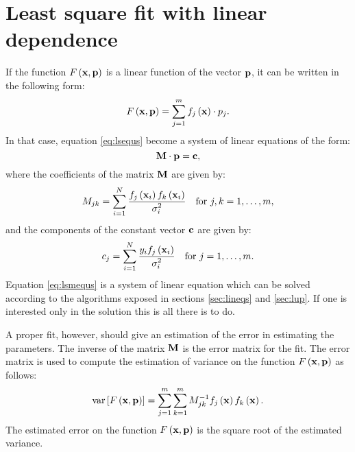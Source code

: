 \documentclass[twoside]{book}
\begin{document}
\section{Least square fit with linear dependence}
\label{eq:lslinear} If the function $F\left({\bf x},{\bf
p}\right)$ is a linear function of the vector ${\bf p}$, it can be
written in the following form:
\begin{equation}
  F\left({\bf x},{\bf p}\right)=\sum_{j=1}^m f_j\left({\bf
  x}\right)\cdot p_j.
\end{equation}
In that case, equation \ref{eq:lsequs} become a system of linear
equations of the form:
\begin{equation}
\label{eq:lsmequs}
  {\bf M}\cdot{\bf p}={\bf c},
\end{equation}
where the coefficients of the matrix ${\bf M}$ are given by:
\begin{equation}
  M_{jk}=\sum_{i=1}^N {\displaystyle f_j\left({\bf x}_i\right)f_k\left({\bf x}_i\right)
  \over\displaystyle \sigma_i^2}\mbox{\quad for $j,k=1,\ldots,m$},
\end{equation}
and the components of the constant vector ${\bf c}$ are given by:
\begin{equation}
  c_j=\sum_{i=1}^N {\displaystyle y_if_j\left({\bf x}_i\right)
  \over\displaystyle \sigma_i^2}\mbox{\quad for $j=1,\ldots,m$}.
\end{equation}
Equation \ref{eq:lsmequs} is a system of linear equation which can
be solved according to the algorithms exposed in sections
\ref{sec:lineqs} and \ref{sec:lup}. If one is interested only in
the solution this is all there is to do.

A proper fit, however, should give an estimation of the error in
estimating the parameters. The inverse of the matrix ${\bf M}$ is
the error matrix for the fit. The error matrix is used to compute
the estimation of variance on the function $F\left({\bf x},{\bf
p}\right)$ as follows:
\begin{equation}
\label{eq:fitError}
  \mathop{\rm var}\left[F\left({\bf x},{\bf p}\right)\right]=\sum_{j=1}^m \sum_{k=1}^m
  M_{jk}^{-1}f_j\left({\bf x}\right)f_k\left({\bf x}\right).
\end{equation}
The estimated error on the function $F\left({\bf x},{\bf
p}\right)$ is the square root of the estimated variance.
\end{document}
